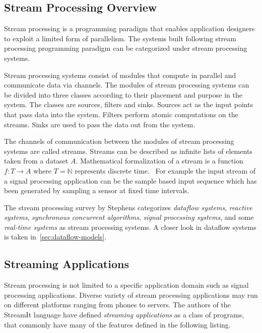 \subsection{Stream Processing Overview}
Stream processing is a programming paradigm that enables application designers to exploit a limited form of parallelism. The systems built following stream processing programming paradigm can be categorized under stream processing systems.

Stream processing systems consist of modules that compute in parallel and communicate data via channels. The modules of stream processing systems can be divided into three classes according to their placement and purpose in the system. The classes are sources, filters and sinks. Sources act as the input points that pass data into the system. Filters perform atomic computations on the streams. Sinks are used to pass the data out from the system.~\cite{stephens1997survey}

The channels of communication between the modules of stream processing systems are called streams. Streams can be described as infinite lists of elements taken from a dataset $A$. Mathematical formalization of a stream is a function $f:T \rightarrow A$ where $T = \mathbb{N}$ represents discrete time.~\cite{stephens1997survey} For example the input stream of a signal processing application can be the sample based input sequence which has been generated by sampling a sensor at fixed time intervals.

The stream processing survey by Stephens \cite{stephens1997survey} categorizes \textit{dataflow systems}, \textit{reactive systems}, \textit{synchronous concurrent algorithms}, \textit{signal processing systems}, and some \textit{real-time systems} as stream processing systems. A closer look in dataflow systems is taken in~\ref{sec:dataflow-models}.

\subsection{Streaming Applications}
Stream processing is not limited to a specific application domain such as signal processing applications. Diverse variety of stream processing applications may run on different platforms ranging from phones to servers. The authors of the StreamIt language \cite{thies2002streamit} have defined \textit{streaming applications} as a class of programs, that commonly have many of the features defined in the following listing.

